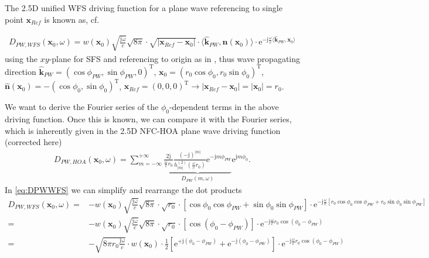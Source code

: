 \documentclass[a4paper,BCOR=15mm,10pt,twoside]{scrartcl}
\begin{document}
The 2.5D unified WFS driving function for a plane wave referencing to single point $\mathbf{x}_{Ref}$ is known as, cf. \cite[2.177]{Schultz2016Diss}

\begin{align}
\label{eq:DPWWFS}
D_{PW,WFS}(\mathbf{x}_0,\omega) = w(\mathbf{x}_0) \sqrt{\frac{\mathrm{j \omega}}{c}} \sqrt{8 \pi} \cdot
\sqrt{|\mathbf{x}_{Ref}-\mathbf{x}_{0}|} \cdot
\langle \mathbf{\hat{k}}_{PW}, \mathbf{\hat{n}}(\mathbf{x}_0) \rangle \cdot
\mathrm{e}^{- \mathrm{j} \frac{\omega}{c}\langle \mathbf{\hat{k}}_{PW}, \mathbf{x}_0 \rangle}
\end{align}
using the $xy$-plane for SFS and referencing to origin as in \cite[Ch. 4.4.2]{Ahrens2012}, thus wave propagating direction
$\mathbf{\hat{k}}_{PW} = (\cos\phi_{PW}, \sin\phi_{PW},0)^\text{T}$, 
$\mathbf{x}_0=(r_0 \cos\phi_0, r_0 \sin\phi_0)^\text{T}$, 
$\mathbf{\hat{n}}(\mathbf{x}_0)=-(\cos\phi_0, \sin\phi_0)^\text{T}$,
$\mathbf{x}_{Ref} = (0,0,0)^\text{T} \rightarrow |\mathbf{x}_{Ref}-\mathbf{x}_{0}|=|\mathbf{x}_{0}|=r_0$.

We want to derive the Fourier series of the $\phi_0$-dependent terms in the above driving function. Once this is known, we can compare it with the Fourier series, which is inherently given in the 2.5D NFC-HOA plane wave driving function \cite[(5.1)]{Ahrens2012} (corrected here)
\begin{align}
D_{PW,HOA}(\mathbf{x}_0,\omega) = \sum\limits_{m=-\infty}^{+\infty} \underbrace{\frac{2 \mathrm{j}}{\frac{\omega}{c} r_0} \frac{(-\mathrm{j})^{|m|}}{h_{|m|}^{(2)}(\frac{\omega}{c} r_0)}
\mathrm{e}^{-\mathrm{j} m \phi_{PW}}}_{D_{PW}(m,\omega)}
\mathrm{e}^{\mathrm{j} m \phi_0}.
\end{align}
In \eqref{eq:DPWWFS} we can simplify and rearrange the dot products
\begin{align}
D_{PW,WFS}(\mathbf{x}_0,\omega)  =& -w(\mathbf{x}_0) \sqrt{\frac{\mathrm{j \omega}}{c}} \sqrt{8 \pi} \cdot
\sqrt{r_0} \cdot
[\cos\phi_0 \cos\phi_{PW} + \sin\phi_0 \sin\phi_{PW}]
\cdot
\mathrm{e}^{- \mathrm{j} \frac{\omega}{c}
[
r_0 \cos\phi_0 \cos\phi_{PW} + r_0 \sin\phi_0 \sin\phi_{PW}
]}\\
\label{eq:DPWWFS_FSPrep1}
=& -w(\mathbf{x}_0) \sqrt{\frac{\mathrm{j \omega}}{c}} \sqrt{8 \pi} \cdot
\sqrt{r_0} \cdot
[\cos(\phi_0-\phi_{PW})]
\cdot
\mathrm{e}^{- \mathrm{j} \frac{\omega}{c} r_0
\cos(\phi_0-\phi_{PW})}\\
=& -\sqrt{8 \pi r_0 \frac{\mathrm{j \omega}}{c}} \cdot
w(\mathbf{x}_0) \cdot
\frac{1}{2}[\mathrm{e}^{+\mathrm{j}(\phi_0-\phi_{PW})}+\mathrm{e}^{-\mathrm{j}(\phi_0-\phi_{PW})}]
\cdot
\mathrm{e}^{- \mathrm{j} \frac{\omega}{c} r_0
\cos(\phi_0-\phi_{PW})}
\end{align}
\end{document}
